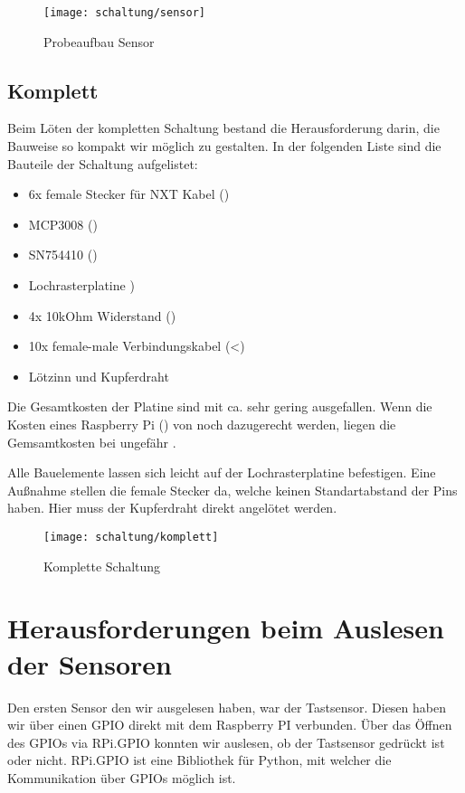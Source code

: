 \begin{figure}[h]
  \centering
  \texttt{[image: schaltung/sensor]}
  \caption{Probeaufbau Sensor}
  \label{schaltung:sensor}
\end{figure}

\subsection{Komplett}

Beim Löten der kompletten Schaltung bestand die Herausforderung darin, die Bauweise so kompakt wir möglich zu gestalten. In der folgenden Liste sind die Bauteile der Schaltung aufgelistet:

\begin{itemize}
  \item 6x female Stecker für NXT Kabel ()
  \item MCP3008 ()
  \item SN754410 ()
  \item Lochrasterplatine )
  \item 4x 10kOhm Widerstand ()
  \item 10x female-male Verbindungskabel (<)
  \item Lötzinn und Kupferdraht
\end{itemize}

Die Gesamtkosten der Platine sind mit ca.  sehr gering ausgefallen. Wenn die Kosten eines Raspberry Pi () von noch dazugerecht werden, liegen die Gemsamtkosten bei ungefähr .

Alle Bauelemente lassen sich leicht auf der Lochrasterplatine befestigen. Eine Außnahme stellen die female Stecker da, welche keinen Standartabstand der Pins haben. Hier muss der Kupferdraht direkt angelötet werden.

\begin{figure}[h]
  \centering
  \texttt{[image: schaltung/komplett]}
  \caption{Komplette Schaltung}
  \label{schaltung:komplett}
\end{figure}

\clearpage

\section{Herausforderungen beim Auslesen der Sensoren}

Den ersten Sensor den wir ausgelesen haben, war der Tastsensor. Diesen haben wir über einen GPIO direkt mit dem Raspberry PI verbunden.
Über das Öffnen des GPIOs via RPi.GPIO konnten wir auslesen, ob der Tastsensor gedrückt ist oder nicht. RPi.GPIO ist eine Bibliothek für Python, mit welcher die Kommunikation über GPIOs möglich ist.

